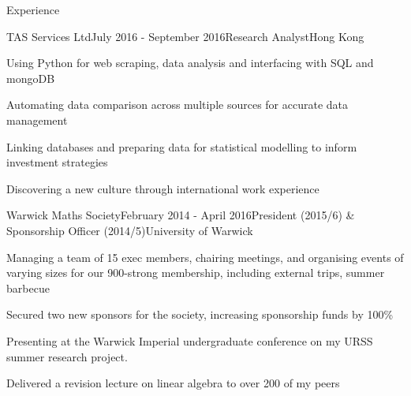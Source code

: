 \documentclass{resume} %
\begin{document}
\begin{rSection}{Experience}

\begin{rSubsection}{TAS Services Ltd}{July 2016 - September 2016}{Research Analyst}{Hong Kong}
\item Using Python for web scraping, data analysis and interfacing with SQL and mongoDB
\item Automating data comparison across multiple sources for accurate data management
\item Linking databases and preparing data for statistical modelling to inform investment strategies
\item Discovering a new culture through international work experience
\end{rSubsection}


\begin{rSubsection}{Warwick Maths Society}{February 2014 - April 2016}{President (2015/6) \& Sponsorship Officer (2014/5)}{University of Warwick}
\item Managing a team of 15 exec members, chairing meetings, and organising events of varying sizes for our 900-strong membership, including external trips, summer barbecue
\item Secured two new sponsors for the society, increasing sponsorship funds by 100\%
\item Presenting at the Warwick Imperial undergraduate conference on my URSS summer research project.
\item Delivered a revision lecture on linear algebra to over 200 of my peers
\end{rSubsection}

\end{rSection}

\end{document}
